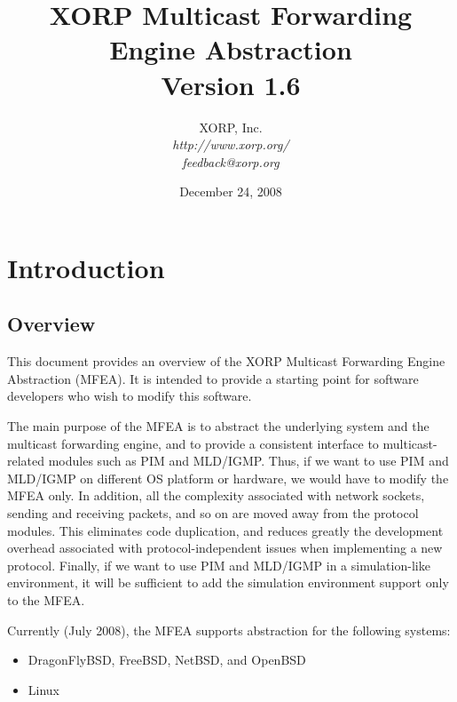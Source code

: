 \documentclass[11pt]{article}
\begin{document}
\title{XORP Multicast Forwarding Engine Abstraction \\
\vspace{1ex}
Version 1.6}
\author{ XORP, Inc.					\\
         {\it http://www.xorp.org/}			\\
	 {\it feedback@xorp.org}
}
\date{December 24, 2008}

\maketitle


\section{Introduction}


\subsection{Overview}

This document provides an overview of the XORP Multicast Forwarding
Engine Abstraction (MFEA). It is intended to provide a starting point
for software developers who wish to modify this software.

The main purpose of the MFEA is to abstract the underlying system and
the multicast forwarding engine, and to provide a consistent interface
to multicast-related modules such as PIM and MLD/IGMP. Thus, if we want
to use PIM and MLD/IGMP on different OS platform or hardware, we
would have to modify the MFEA only. In addition, all the
complexity associated with network sockets, sending and receiving
packets, and so on are moved away from the protocol modules.
This eliminates code duplication, and reduces greatly the
development overhead associated with protocol-independent
issues when implementing a new protocol. Finally, if we want to use
PIM and MLD/IGMP in a simulation-like environment, it will be sufficient
to add the simulation environment support only to the MFEA.

Currently (July 2008), the MFEA supports abstraction for
the following systems:

\begin{itemize}
  \item DragonFlyBSD, FreeBSD, NetBSD, and OpenBSD
  \item Linux
\end{itemize}
\end{document}
